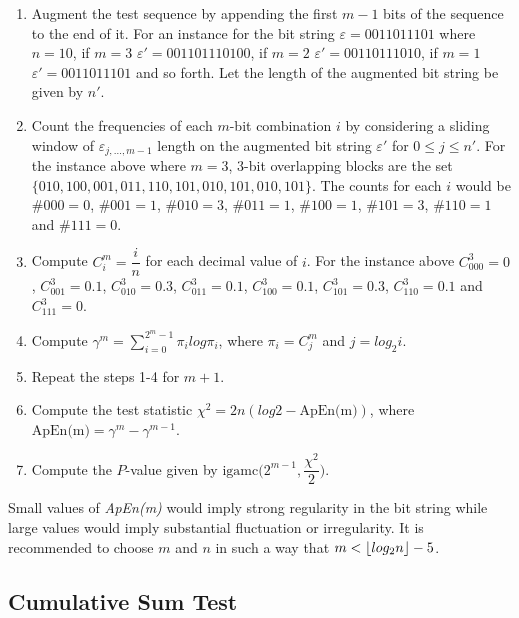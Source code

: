 \begin{enumerate}
    \item Augment the test sequence by appending the first $m-1$ bits of the sequence to the end of it. For an instance for the bit string $\varepsilon=0011011101$ where $n=10$, if $m=3$ $\varepsilon'=001101110100$, if $m=2$ $\varepsilon'=00110111010$, if $m=1$ $\varepsilon'=0011011101$ and so forth. Let the length of the augmented bit string be given by $n'$.
    
    \item Count the frequencies of each $m$-bit combination $i$ by considering a sliding window of $\varepsilon_{j, \ldots, m-1}$ length on the augmented bit string $\varepsilon'$ for $0 \leq j \leq n'$. For the instance above where $m=3$, 3-bit overlapping blocks are the set $\{010, 100, 001, 011, 110, 101, 010, 101, 010, 101\}$. The counts for each $i$ would be $\#000=0$, $\#001=1$, $\#010=3$, $\#011=1$, $\#100=1$, $\#101=3$, $\#110=1$ and $\#111=0$.
    
    \item Compute $C^m_i=\dfrac{i}{n}$ for each decimal value of $i$. For the instance above $C^3_000=0$, $C^3_001=0.1$, $C^3_010=0.3$, $C^3_011=0.1$, $C^3_100=0.1$, $C^3_101=0.3$, $C^3_110=0.1$ and $C^3_111=0$.
    
    \item Compute $\gamma^m=\sum^{2^m-1}_{i=0}\pi_ilog\pi_i$, where $\pi_i=C^m_j$ and $j=log_2i$.
    
    \item Repeat the steps 1-4 for $m+1$.
    
    \item Compute the test statistic $\chi^2=2n(log2-\text{ApEn(m)})$, where $\text{ApEn(m)}=\gamma^m-\gamma^{m-1}$.
    
    \item Compute the $P$-value given by $\text{igamc}\bigg(2^{m-1},\dfrac{\chi^2}{2}\bigg)$.
\end{enumerate}

Small values of \textit{ApEn(m)} would imply strong regularity in the bit string while large values would imply substantial fluctuation or irregularity. It is recommended to choose $m$ and $n$ in such a way that $m < \floor*{log_2n}-5$.

\subsection{Cumulative Sum Test}

